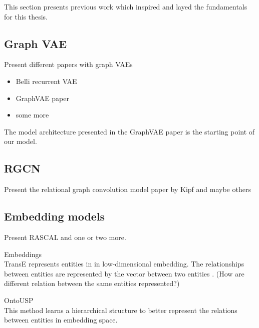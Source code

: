 This section presents previous work which inspired and layed the fundamentals for this thesis.

\subsection{Graph VAE}

Present different papers with graph VAEs

\begin{itemize}
    \item Belli recurrent VAE
    \item GraphVAE paper
    \item some more
\end{itemize}

The model architecture presented in the GraphVAE paper is the starting point of our model.

\subsection{RGCN}

Present the relational graph convolution model paper by Kipf and maybe others

\subsection{Embedding models}

Present RASCAL and one or two more.

\Graph Embeddings\\
TransE represents entities in in low-dimensional embedding. The relationships between entities are represented by the vector between two entities \cite{bordes_translating_2013}.
(How are different relation between the same entities represented?)

OntoUSP\\
This method learns a hierarchical structure to better represent the relations between entities in embedding space.
